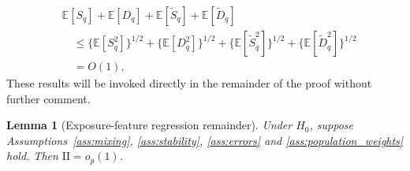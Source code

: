 \documentclass[12pt]{article}
\def\E{\mathbb{E}}
\newtheorem{lemma}[theorem]{Lemma}
\newcommand{\Rajen}[1]{{ \color{red} Rajen: #1}}
\numberwithin{equation}{section}
\begin{document}
\begin{equation}
\label{eq:deletion-first-moments}
\begin{aligned}
&\E[S_q]+\E[D_q]+\E[\tilde S_q]+\E[\tilde D_q]\\
&\quad\leq\{\E[S_q^2]\}^{1/2}+\{\E[D_q^2]\}^{1/2}
+\{\E[\tilde S_q^2]\}^{1/2}+\{\E[\tilde D_q^2]\}^{1/2}\\
&\quad=O(1),
\end{aligned}
\end{equation}
These results will be invoked directly in the remainder of the proof without further comment.
\begin{lemma}[Exposure-feature regression remainder]
\label{lem:exposure-remainder-moments}
Under \(H_0\), suppose Assumptions~\ref{ass:mixing},
\ref{ass:stability}, \ref{ass:errors} and
\ref{ass:population_weights} hold. 
Then \(\mathrm{II}=o_p(1)\).
\end{lemma}
\end{document}
